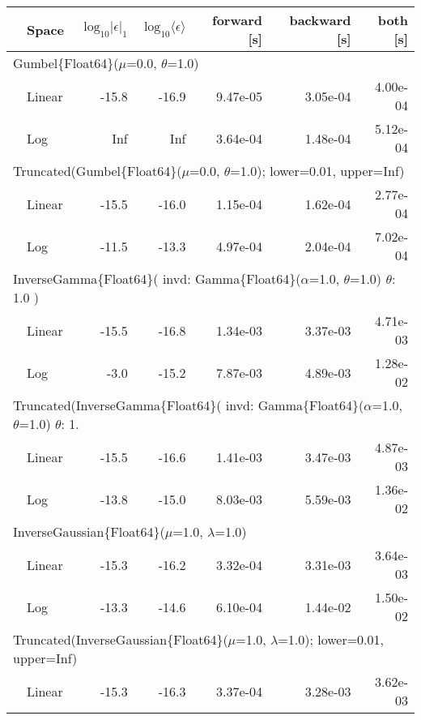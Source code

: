 \begin{tabular}{|llrrrrr|} \hline
& Space & $\mbox{log}_{10}|\epsilon|_1$ & $\mbox{log}_{10}\langle\epsilon\rangle$ & forward [s] & backward [s] & both [s]\\ \hline
\multicolumn{7}{|l|}{Gumbel\{Float64\}($\mu$=0.0, $\theta$=1.0)}\\ \hline
& Linear & {\color{blue}-15.8} & {\color{blue}-16.9} & {\color{blue}9.47e-05} & 3.05e-04 & {\color{blue}4.00e-04}\\
& Log & Inf & Inf & 3.64e-04 & {\color{blue}1.48e-04} & 5.12e-04\\
\hline
\multicolumn{7}{|l|}{Truncated(Gumbel\{Float64\}($\mu$=0.0, $\theta$=1.0); lower=0.01, upper=Inf)}\\ \hline
& Linear & {\color{blue}-15.5} & {\color{blue}-16.0} & {\color{blue}1.15e-04} & {\color{blue}1.62e-04} & {\color{blue}2.77e-04}\\
& Log & -11.5 & -13.3 & 4.97e-04 & 2.04e-04 & 7.02e-04\\
\hline
\multicolumn{7}{|l|}{InverseGamma\{Float64\}(
invd: Gamma\{Float64\}($\alpha$=1.0, $\theta$=1.0)
$\theta$: 1.0
)
}\\ \hline
& Linear & {\color{blue}-15.5} & {\color{blue}-16.8} & {\color{blue}1.34e-03} & {\color{blue}3.37e-03} & {\color{blue}4.71e-03}\\
& Log & -3.0 & -15.2 & 7.87e-03 & 4.89e-03 & 1.28e-02\\
\hline
\multicolumn{7}{|l|}{Truncated(InverseGamma\{Float64\}(
invd: Gamma\{Float64\}($\alpha$=1.0, $\theta$=1.0)
$\theta$: 1.}\\ \hline
& Linear & {\color{blue}-15.5} & {\color{blue}-16.6} & {\color{blue}1.41e-03} & {\color{blue}3.47e-03} & {\color{blue}4.87e-03}\\
& Log & -13.8 & -15.0 & 8.03e-03 & 5.59e-03 & 1.36e-02\\
\hline
\multicolumn{7}{|l|}{InverseGaussian\{Float64\}($\mu$=1.0, $\lambda$=1.0)}\\ \hline
& Linear & {\color{blue}-15.3} & {\color{blue}-16.2} & {\color{blue}3.32e-04} & {\color{blue}3.31e-03} & {\color{blue}3.64e-03}\\
& Log & -13.3 & -14.6 & 6.10e-04 & 1.44e-02 & 1.50e-02\\
\hline
\multicolumn{7}{|l|}{Truncated(InverseGaussian\{Float64\}($\mu$=1.0, $\lambda$=1.0); lower=0.01, upper=Inf)}\\ \hline
& Linear & {\color{blue}-15.3} & {\color{blue}-16.3} & {\color{blue}3.37e-04} & {\color{blue}3.28e-03} & {\color{blue}3.62e-03}\\

\end{tabular}
